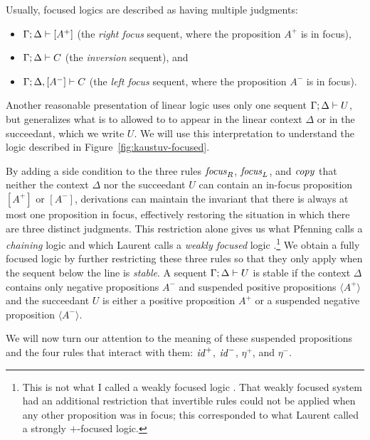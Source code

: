 Usually, focused logics are described as
having multiple judgments:
\begin{itemize}
\item ${\Gamma};{\Delta} \vdash [{A^+}] \mathstrut$ (the {\it right focus} sequent, where
the proposition $A^+$ is in focus),
\item ${\Gamma};{\Delta} \vdash {C} \mathstrut$ (the {\it inversion} sequent), and
\item ${\Gamma};{\Delta}, [{A^-}] \vdash {C} \mathstrut$ (the {\it left focus} sequent,
where the proposition $A^-$ is in focus).
\end{itemize}
Another reasonable presentation of linear logic uses only one sequent
${\Gamma};{\Delta} \vdash {U} \mathstrut$, but generalizes what is to allowed to
to appear in the linear context $\Delta$ or in the succeedant, which
we write $U$. We will use this interpretation to understand the logic
described in Figure~\ref{fig:kaustuv-focused}.



By adding a side condition to the three rules ${\it focus}_R$, ${\it
  focus}_L$, and ${\it copy}$ that neither the context $\Delta$ nor
the succeedant $U$ can contain an in-focus proposition $[A^+]$ or
$[A^-]$, derivations can maintain the invariant that there is always
at most one proposition in focus, effectively restoring the situation
in which there are three distinct judgments.  This restriction alone
gives us what Pfenning calls a {\it chaining} logic
\cite{pfenning12chaining} and which Laurent calls a {\it weakly
  focused} logic \cite{laurent04proof}.\footnote{This is not what I
  called a weakly focused logic \cite{simmons09weak}. That weakly
  focused system had an additional restriction that invertible rules
  could not be applied when any other proposition was in focus; this
  corresponded to what Laurent called a strongly $+$-focused logic.}
We obtain a fully focused logic by further restricting these three
rules so that they only apply when the sequent below the line is {\it
  stable}.  A sequent ${\Gamma};{\Delta} \vdash {U} \mathstrut$ is stable if the
context $\Delta$ contains only negative propositions $A^-$ and
suspended positive propositions $\langle A^+ \rangle$ and the
succeedant $U$ is either a positive proposition $A^+$ or a suspended
negative proposition $\langle A^- \rangle$. 

We will now turn our attention to the meaning of these suspended
propositions and the four rules that interact with them: ${\it id}^+$,
${\it id}^-$, $\eta^+$, and $\eta^-$.

